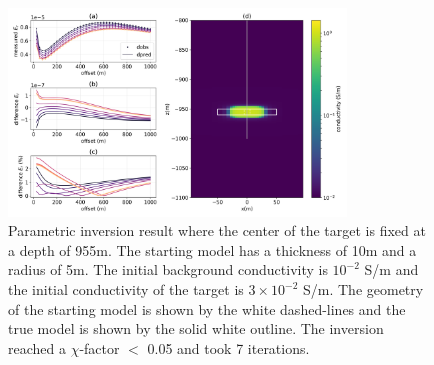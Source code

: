 \begin{figure}
    \begin{center}
    \includegraphics[width=0.8\textwidth]{figures/inversion/parametric_voxel2_dz10_fixedz0.png}
    \end{center}
\caption{
    Parametric inversion result where the center of the target is fixed at a depth
    of 955m. The starting model has a thickness of 10m and a radius of 5m. The initial background
    conductivity is $10^{-2}$ S/m and the initial conductivity of the target is $3\times10^{-2}$ S/m.
    The geometry of the starting model is shown by the white dashed-lines and the
    true model is shown by the solid white outline. The inversion reached a $\chi$-factor $<$ 0.05
    and took 7 iterations.
}
\label{fig:parametric_voxel2_dz10_fixedz0}
\end{figure}
